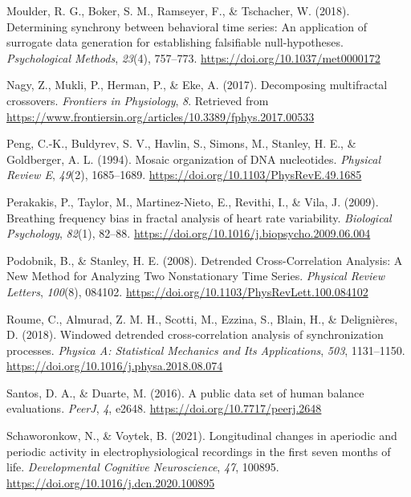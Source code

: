 \documentclass[
  man]{apa6}
\newlength{\cslhangindent}
\newlength{\cslentryspacingunit} %
\newenvironment{CSLReferences}[2] %
 {%
  \setlength{\parindent}{0pt}
  \ifodd #1
  \let\oldpar\par
  \def\par{\hangindent=\cslhangindent\oldpar}
  \fi
  \setlength{\parskip}{#2\cslentryspacingunit}
 }%
 {}
\begin{document}
\begin{CSLReferences}{1}{0}
\leavevmode{}%
Moulder, R. G., Boker, S. M., Ramseyer, F., \& Tschacher, W. (2018). Determining synchrony between behavioral time series: An application of surrogate data generation for establishing falsifiable null-hypotheses. \emph{Psychological Methods}, \emph{23}(4), 757--773. \url{https://doi.org/10.1037/met0000172}

\leavevmode{}%
Nagy, Z., Mukli, P., Herman, P., \& Eke, A. (2017). Decomposing multifractal crossovers. \emph{Frontiers in Physiology}, \emph{8}. Retrieved from \url{https://www.frontiersin.org/articles/10.3389/fphys.2017.00533}

\leavevmode{}%
Peng, C.-K., Buldyrev, S. V., Havlin, S., Simons, M., Stanley, H. E., \& Goldberger, A. L. (1994). Mosaic organization of {DNA} nucleotides. \emph{Physical Review E}, \emph{49}(2), 1685--1689. \url{https://doi.org/10.1103/PhysRevE.49.1685}

\leavevmode{}%
Perakakis, P., Taylor, M., Martinez-Nieto, E., Revithi, I., \& Vila, J. (2009). Breathing frequency bias in fractal analysis of heart rate variability. \emph{Biological Psychology}, \emph{82}(1), 82--88. \url{https://doi.org/10.1016/j.biopsycho.2009.06.004}

\leavevmode{}%
Podobnik, B., \& Stanley, H. E. (2008). Detrended {Cross}-{Correlation} {Analysis}: {A} {New} {Method} for {Analyzing} {Two} {Nonstationary} {Time} {Series}. \emph{Physical Review Letters}, \emph{100}(8), 084102. \url{https://doi.org/10.1103/PhysRevLett.100.084102}

\leavevmode{}%
Roume, C., Almurad, Z. M. H., Scotti, M., Ezzina, S., Blain, H., \& Delignières, D. (2018). Windowed detrended cross-correlation analysis of synchronization processes. \emph{Physica A: Statistical Mechanics and Its Applications}, \emph{503}, 1131--1150. \url{https://doi.org/10.1016/j.physa.2018.08.074}

\leavevmode{}%
Santos, D. A., \& Duarte, M. (2016). A public data set of human balance evaluations. \emph{PeerJ}, \emph{4}, e2648. \url{https://doi.org/10.7717/peerj.2648}

\leavevmode{}%
Schaworonkow, N., \& Voytek, B. (2021). Longitudinal changes in aperiodic and periodic activity in electrophysiological recordings in the first seven months of life. \emph{Developmental Cognitive Neuroscience}, \emph{47}, 100895. \url{https://doi.org/10.1016/j.dcn.2020.100895}


\end{CSLReferences}
\end{document}
